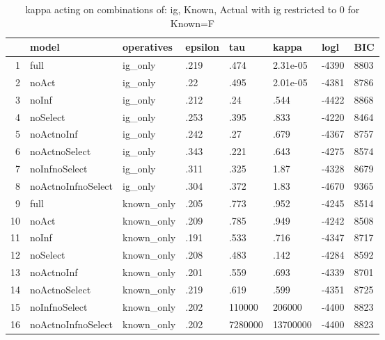 \begin{table}[ht]
\centering
\begin{tabular}{rlllllll}
  \hline
 & model & operatives & epsilon & tau & kappa & logl & BIC \\ 
  \hline
1 & full & ig\_only & .219 & .474 & 2.31e-05 & -4390 & 8803 \\ 
  2 & noAct & ig\_only & .22 & .495 & 2.01e-05 & -4381 & 8786 \\ 
  3 & noInf & ig\_only & .212 & .24 & .544 & -4422 & 8868 \\ 
  4 & noSelect & ig\_only & .253 & .395 & .833 & -4220 & 8464 \\ 
  5 & noActnoInf & ig\_only & .242 & .27 & .679 & -4367 & 8757 \\ 
  6 & noActnoSelect & ig\_only & .343 & .221 & .643 & -4275 & 8574 \\ 
  7 & noInfnoSelect & ig\_only & .311 & .325 & 1.87 & -4328 & 8679 \\ 
  8 & noActnoInfnoSelect & ig\_only & .304 & .372 & 1.83 & -4670 & 9365 \\ 
  9 & full & known\_only & .205 & .773 & .952 & -4245 & 8514 \\ 
  10 & noAct & known\_only & .209 & .785 & .949 & -4242 & 8508 \\ 
  11 & noInf & known\_only & .191 & .533 & .716 & -4347 & 8717 \\ 
  12 & noSelect & known\_only & .208 & .483 & .142 & -4284 & 8592 \\ 
  13 & noActnoInf & known\_only & .201 & .559 & .693 & -4339 & 8701 \\ 
  14 & noActnoSelect & known\_only & .219 & .619 & .599 & -4351 & 8725 \\ 
  15 & noInfnoSelect & known\_only & .202 & 110000 & 206000 & -4400 & 8823 \\ 
  16 & noActnoInfnoSelect & known\_only & .202 & 7280000 & 13700000 & -4400 & 8823 \\ 
   \hline
\end{tabular}
\caption{kappa acting on combinations of: ig, Known, Actual with ig restricted to 0 for Known=F} 
\end{table}
